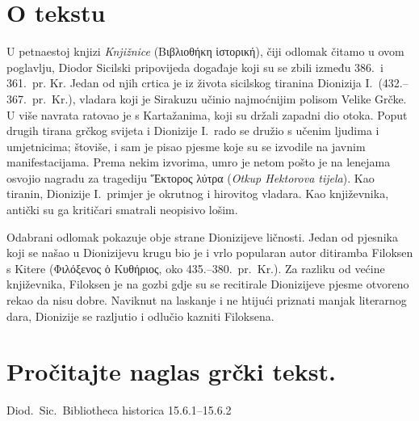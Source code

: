 


\section*{O tekstu}

U petnaestoj knjizi \textit{Knjižnice} \textgreek[variant=ancient]{(Βιβλιοθήκη ἱστορική),} čiji odlomak čitamo u ovom poglavlju, Diodor Sicilski pripovijeda događaje koji su se zbili između 386.\ i 361.\ pr. Kr. Jedan od njih crtica je iz života sicilskog tiranina Dionizija I.\ (432.–367.\ pr.~Kr.), vladara koji je Sirakuzu učinio najmoćnijim polisom Velike Grčke. U više navrata ratovao je s Kartažanima, koji su držali zapadni dio otoka. Poput drugih tirana grčkog svijeta i Dionizije I.\ rado se družio s učenim ljudima i umjetnicima; štoviše, i sam je pisao pjesme koje su se izvodile na javnim manifestacijama. Prema nekim izvorima, umro je netom pošto je na lenejama osvojio nagradu za tragediju \textgreek[variant=ancient]{Ἕκτορος λύτρα} (\textit{Otkup Hektorova tijela}). Kao tiranin, Dionizije I.\ primjer je okrutnog i hirovitog vladara. Kao književnika, antički su ga kritičari smatrali neopisivo lošim.
 
Odabrani odlomak pokazuje obje strane Dionizijeve ličnosti. Jedan od pjesnika koji se našao u Dionizijevu krugu bio je i vrlo popularan autor ditiramba Filoksen s Kitere (\textgreek[variant=ancient]{Φιλόξενος ὁ Κυθήριος,} oko 435.–380.\ pr.~Kr.). Za razliku od većine književnika, Filoksen je na gozbi gdje su se recitirale Dionizijeve pjesme otvoreno rekao da nisu dobre. Naviknut na laskanje i ne htijući priznati manjak literarnog dara, Dionizije se razljutio i odlučio kazniti Filoksena.

\newpage

\section*{Pročitajte naglas grčki tekst.}

Diod.~Sic.\ Bibliotheca historica 15.6.1–15.6.2


\medskip


